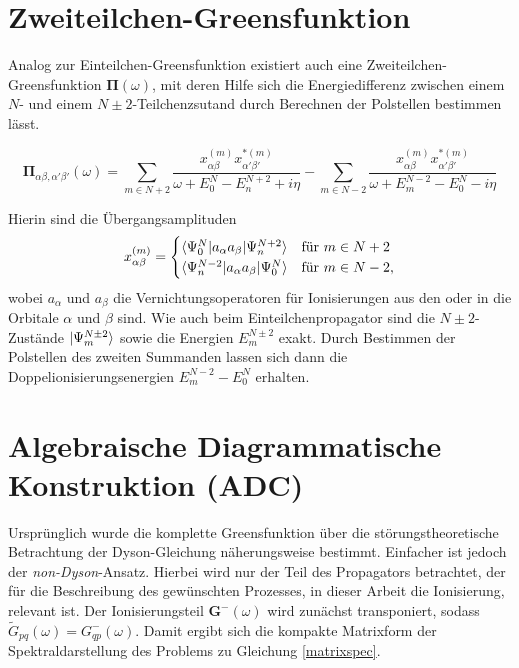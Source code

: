 \section{Zweiteilchen-Greensfunktion}
Analog zur Einteilchen-Greensfunktion existiert auch eine Zweiteilchen-Greensfunktion $\mathbf{\Pi}(\omega)$, mit deren Hilfe sich die Energiedifferenz zwischen einem $N$- und einem $N\pm 2$-Teilchenzsutand durch Berechnen der Polstellen bestimmen lässt.

\begin{equation}
\mathbf{\Pi}_{\alpha\beta,\alpha'\beta'}(\omega) = \sum\limits_{m\in N+2} \frac{x^{(m)}_{\alpha\beta}x^{*(m)}_{\alpha'\beta'}}{\omega +E_0^N-E_n^{N+2}+i\eta} - \sum\limits_{m\in N-2} \frac{x^{(m)}_{\alpha\beta}x^{*(m)}_{\alpha'\beta'}}{\omega +E_m^{N-2}-E_0^{N}-i\eta}
\end{equation}

Hierin sind die Übergangsamplituden
\begin{equation}
x^{(m)}_{\alpha\beta}=\begin{cases}
\braket{\Psi_0^N|a_\alpha a_\beta|\Psi_n^{N+2}} & \text{für } m\in N+2\\
\braket{\Psi_n^{N-2}|a_\alpha a_\beta|\Psi_0^{N}} & \text{für } m\in N-2,
\end{cases}
\end{equation}
wobei $a_\alpha$ und $a_\beta$ die Vernichtungsoperatoren für Ionisierungen aus den oder in die Orbitale $\alpha$ und $\beta$ sind. Wie auch beim Einteilchenpropagator sind die $N\pm 2$-Zustände $\ket{\Psi_m^{N\pm 2}}$ sowie die Energien $E_m^{N\pm 2}$ exakt. Durch Bestimmen der Polstellen des zweiten Summanden lassen sich dann die Doppelionisierungsenergien $E_m^{N-2}-E_0^N$ erhalten.\cite{Tarantelli89}



\section{Algebraische Diagrammatische Konstruktion (ADC)}
Ursprünglich wurde die komplette Greensfunktion über die störungstheoretische Betrachtung der Dyson-Gleichung näherungsweise bestimmt. Einfacher ist jedoch der \emph{non-Dyson}-Ansatz. Hierbei wird nur der Teil des Propagators betrachtet, der für die Beschreibung des gewünschten Prozesses, in dieser Arbeit die Ionisierung, relevant ist.\cite{Schirmer98} Der Ionisierungsteil $\mathbf{G^-}(\omega)$ wird zunächst transponiert, sodass $\tilde{G}_{pq}(\omega) = G^-_{qp}(\omega)$. Damit ergibt sich die kompakte Matrixform der Spektraldarstellung des Problems zu Gleichung \ref{matrixspec}.

